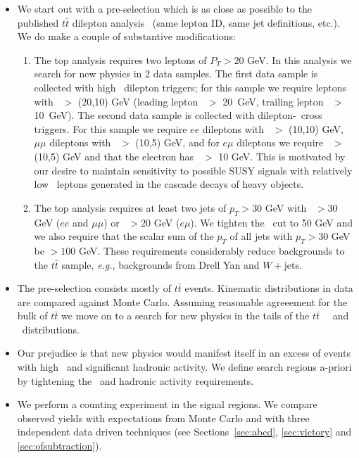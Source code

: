 \begin{itemize}

\item We start out with a pre-selection which is as close as 
possible to the published $t\bar{t}$
dilepton analysis~\cite{ref:top} (same lepton ID, same jet definitions,
etc.).  We do make a couple of substantive modifications:

\begin{enumerate}
\item The top analysis requires two leptons of $P_T > 20$ GeV.  
In this analysis we search for new physics in 2 data samples. The first data
sample is collected with high \pt\ dilepton triggers; for this sample we require
leptons with \pt\ $>$ (20,10) GeV (leading lepton \pt\ $>$ 20~GeV,
trailing lepton \pt\ $>$ 10~GeV). The second data sample is collected
with dilepton-\Ht\ cross triggers. For this sample we require $ee$ dileptons
with \pt\ $>$ (10,10) GeV, $\mu\mu$ dileptons with \pt\ $>$ (10,5) GeV, and for $e\mu$
dileptons we require \pt\ $>$ (10,5) GeV and that the electron has \pt\ $>$ 10 GeV.  
This is motivated by our desire to maintain sensitivity to possible
SUSY signals with relatively low \pt\ leptons generated in the 
cascade decays of heavy objects.
\item The top analysis requires at least two jets of $p_T > 30$
GeV with \met\ $>30$ GeV ($ee$ and $\mu\mu$) or \met\ $>20$ GeV ($e\mu$).
We tighten the \met\ cut to 50 GeV and we 
also require that the scalar sum of the $p_T$ of all jets with $p_T > 30$
GeV be $> 100$ GeV.  These requirements considerably
reduce backgrounds to the $t\bar{t}$ sample, {\em e.g.}, backgrounds
from Drell Yan and $W+$jets.
\end{enumerate}

\item The pre-selection consists mostly of $t\bar{t}$ events.  
Kinematic distributions in data are compared against Monte Carlo.
Assuming reasonable agreeement for the bulk of $t\bar{t}$ we move on to a 
search for new physics in the tails of the $t\bar{t}$ \ \met\ and \Ht\ distributions.

\item Our prejudice is that new physics would manifest itself in an
excess of events with high \met\ and significant hadronic activity.
We define search regions a-priori by tightening the \met\ and 
hadronic activity requirements.

\item We perform a counting experiment in the signal regions.  We compare
observed yields with expectations from Monte Carlo and with three independent
data driven techniques (see Sections~\ref{sec:abcd}, \ref{sec:victory} and \ref{sec:ofsubtraction}).

\end{itemize}



